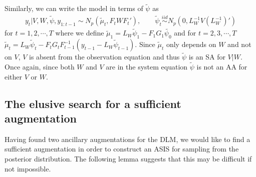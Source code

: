 \documentclass[12pt]{article}
\begin{document}
Similarly, we can write the model in terms of $\tilde{\psi}$ as
\begin{align*}
  y_t|V,W,\tilde{\psi},y_{1:t-1} \sim N_p(\tilde{\mu}_t, F_tWF_t'), \qquad 
  \tilde{\psi}_t  \stackrel{iid}{\sim} N_p(0,L_W^{-1}V(L_W^{-1})')
\end{align*}
for $t=1,2,\cdots,T$ where we define $\tilde{\mu}_1 = L_W\tilde{\psi}_1 - F_1G_1\tilde{\psi_0}$ and for $t=2,3,\cdots,T$ $\tilde{\mu}_t =L_W\tilde{\psi}_t - F_tG_tF_{t-1}^{-1}(y_{t-1} - L_{W}\tilde{\psi}_{t-1})$. Since $\tilde{\mu}_t$ only depends on $W$ and not on $V$, $V$ is absent from the observation equation and thus $\tilde{\psi}$ is an SA for $V|W$. Once again, since both $W$ and $V$ are in the system equation $\tilde{\psi}$ is not an AA for either $V$ or $W$.

\subsection{The elusive search for a sufficient augmentation}

Having found two ancillary augmentations for the DLM, we would like to find a sufficient augmentation in order to construct an ASIS for sampling from the posterior distribution. The following lemma suggests that this may be difficult if not impossible.
\end{document}
